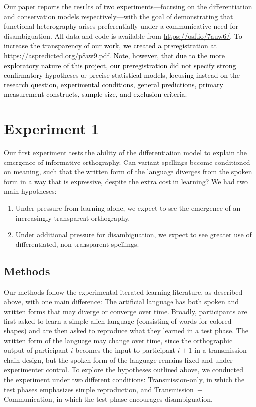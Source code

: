 \documentclass[doc,biblatex]{apa7}
\newcommand\firstrevision[1]{\textcolor{black}{#1}}
\begin{document}
Our paper reports the results of two experiments---focusing on the differentiation and conservation models respectively---with the goal of demonstrating that functional heterography arises preferentially under a communicative need for disambiguation. All data and code is available from \url{https://osf.io/7auw6/}. \firstrevision{To increase the transparency of our work, we created a preregistration at \url{https://aspredicted.org/p8aw9.pdf}. Note, however, that due to the more exploratory nature of this project, our preregistration did not specify strong confirmatory hypotheses or precise statistical models, focusing instead on the research question, experimental conditions, general predictions, primary measurement constructs, sample size, and exclusion criteria.}


\section{Experiment 1}

Our first experiment tests the ability of the differentiation model to explain the emergence of informative orthography. Can variant spellings become conditioned on meaning, such that the written form of the language diverges from the spoken form in a way that is expressive, despite the extra cost in learning? We had two main hypotheses:
\begin{enumerate}
	\item Under pressure from learning alone, we expect to see the emergence of an increasingly transparent orthography.
	\item Under additional pressure for disambiguation, we expect to see greater use of differentiated, non-transparent spellings.
\end{enumerate}

\subsection{Methods}

Our methods follow the experimental iterated learning literature, as described above, with one main difference: The artificial language has both spoken and written forms that may diverge or converge over time. Broadly, participants are first asked to learn a simple alien language (consisting of words for colored shapes) and are then asked to reproduce what they learned in a test phase. The written form of the language may change over time, since the orthographic output of participant $i$ becomes the input to participant $i+1$ in a transmission chain design, but the spoken form of the language remains fixed and under experimenter control. To explore the hypotheses outlined above, we conducted the experiment under two different conditions: Transmission-only, in which the test phases emphasizes simple reproduction, and Transmission~+ Communication, in which the test phase encourages disambiguation.
\end{document}
